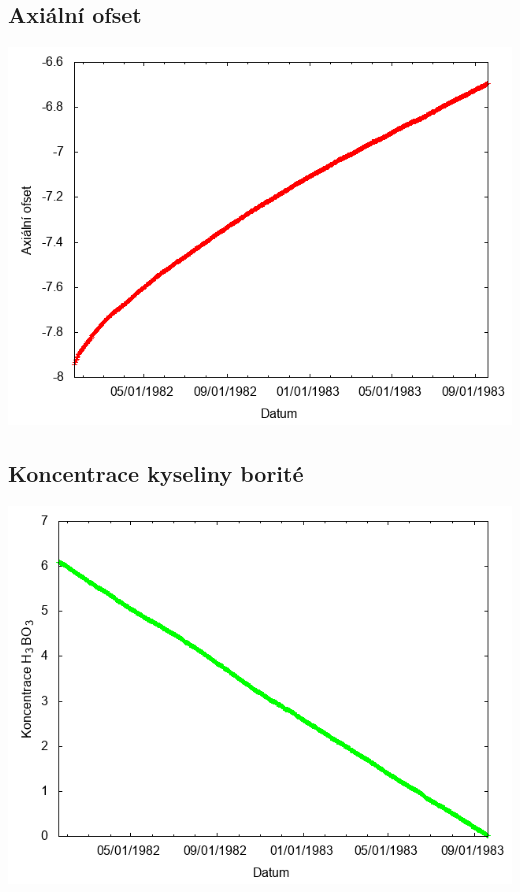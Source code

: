 \documentclass[a4paper,twoside,11pt]{article}
\begin{document}
\subsection*{Axiální ofset}
\begin{center}
\includegraphics[width=.8\textwidth]{graphs/Atlantis_03_ao.png}
\end{center}

\subsection*{Koncentrace kyseliny borité}
\begin{center}
\includegraphics[width=.8\textwidth]{graphs/Atlantis_03_bc.png}
\end{center}
\end{document}
